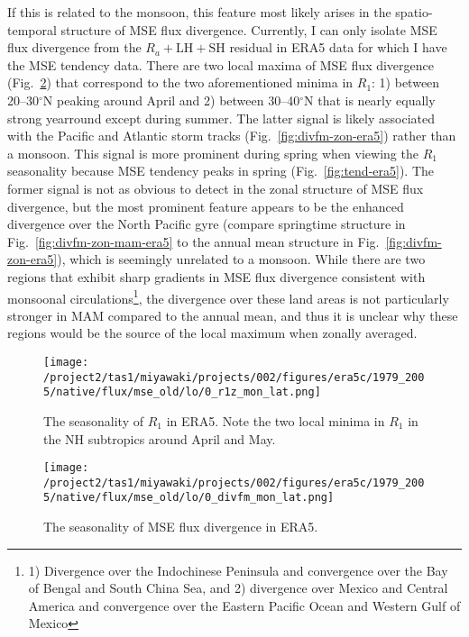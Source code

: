 \documentclass{article}
\begin{document}
If this is related to the monsoon, this feature most likely arises in the spatio-temporal structure of MSE flux divergence. Currently, I can only isolate MSE flux divergence from the $R_a+\mathrm{LH+SH}$ residual in ERA5 data for which I have the MSE tendency data. There are two local maxima of MSE flux divergence (Fig.~\ref{fig:divfm-era5}) that correspond to the two aforementioned minima in $R_1$: 1) between 20--30$^\circ$N peaking around April and 2) between 30--40$^\circ$N that is nearly equally strong yearround except during summer. The latter signal is likely associated with the Pacific and Atlantic storm tracks (Fig.~\ref{fig:divfm-zon-era5}) rather than a monsoon. This signal is more prominent during spring when viewing the $R_1$ seasonality because MSE tendency peaks in spring (Fig.~\ref{fig:tend-era5}). The former signal is not as obvious to detect in the zonal structure of MSE flux divergence, but the most prominent feature appears to be the enhanced divergence over the North Pacific gyre (compare springtime structure in Fig.~\ref{fig:divfm-zon-mam-era5} to the annual mean structure in Fig.~\ref{fig:divfm-zon-era5}), which is seemingly unrelated to a monsoon. While there are two regions that exhibit sharp gradients in MSE flux divergence consistent with monsoonal circulations\footnote{1) Divergence over the Indochinese Peninsula and convergence over the Bay of Bengal and South China Sea, and 2) divergence over Mexico and Central America and convergence over the Eastern Pacific Ocean and Western Gulf of Mexico}, the divergence over these land areas is not particularly stronger in MAM compared to the annual mean, and thus it is unclear why these regions would be the source of the local maximum when zonally averaged.

\begin{figure}
    \texttt{[image: /project2/tas1/miyawaki/projects/002/figures/era5c/1979\_2005/native/flux/mse\_old/lo/0\_r1z\_mon\_lat.png]}
    \caption{The seasonality of $R_1$ in ERA5. Note the two local minima in $R_1$ in the NH subtropics around April and May.}
    \label{fig:r1-era5}
\end{figure}

\begin{figure}
    \texttt{[image: /project2/tas1/miyawaki/projects/002/figures/era5c/1979\_2005/native/flux/mse\_old/lo/0\_divfm\_mon\_lat.png]}
    \caption{The seasonality of MSE flux divergence in ERA5.}
    \label{fig:divfm-era5}
\end{figure}
\end{document}
